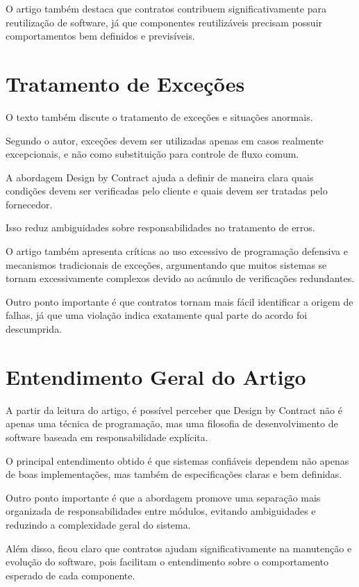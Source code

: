 \documentclass[conference]{IEEEtran}
\begin{document}
O artigo também destaca que contratos contribuem significativamente para reutilização de software, já que componentes reutilizáveis precisam possuir comportamentos bem definidos e previsíveis.

\section{Tratamento de Exceções}

O texto também discute o tratamento de exceções e situações anormais.

Segundo o autor, exceções devem ser utilizadas apenas em casos realmente excepcionais, e não como substituição para controle de fluxo comum.

A abordagem Design by Contract ajuda a definir de maneira clara quais condições devem ser verificadas pelo cliente e quais devem ser tratadas pelo fornecedor.

Isso reduz ambiguidades sobre responsabilidades no tratamento de erros.

O artigo também apresenta críticas ao uso excessivo de programação defensiva e mecanismos tradicionais de exceções, argumentando que muitos sistemas se tornam excessivamente complexos devido ao acúmulo de verificações redundantes.

Outro ponto importante é que contratos tornam mais fácil identificar a origem de falhas, já que uma violação indica exatamente qual parte do acordo foi descumprida.

\section{Entendimento Geral do Artigo}

A partir da leitura do artigo, é possível perceber que Design by Contract não é apenas uma técnica de programação, mas uma filosofia de desenvolvimento de software baseada em responsabilidade explícita.

O principal entendimento obtido é que sistemas confiáveis dependem não apenas de boas implementações, mas também de especificações claras e bem definidas.

Outro ponto importante é que a abordagem promove uma separação mais organizada de responsabilidades entre módulos, evitando ambiguidades e reduzindo a complexidade geral do sistema.

Além disso, ficou claro que contratos ajudam significativamente na manutenção e evolução do software, pois facilitam o entendimento sobre o comportamento esperado de cada componente.
\end{document}
